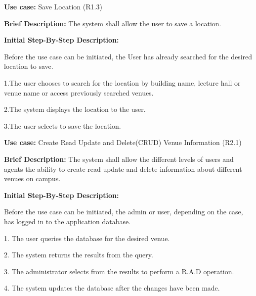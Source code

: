 \documentclass{article}
\begin{document}
    \begin{flushleft}
    \textbf{Use case:} Save Location (R1.3)
    \newline
    	
    \textbf{Brief Description:}
    \newline
    The system shall allow the user to save a location.
    \newline
    
    \textbf{Initial Step-By-Step Description:}
    
    Before the use case can be initiated, the User has already searched for the desired location to save.
	\newline    
	
1.The user chooses to search for the location by building name, lecture hall or venue name or access previously searched venues.

2.The system displays the location to the user.

3.The user selects to save the location.

\end{flushleft}

\begin{flushleft}
    \textbf{Use case:} Create Read Update and Delete(CRUD) Venue Information (R2.1)
    \newline
    	
    \textbf{Brief Description:}
    \newline
    The system shall allow the different levels of users and agents the ability to create read update and delete information about different venues on campus.
    \newline
    
    \textbf{Initial Step-By-Step Description:}
    
    Before the use case can be initiated, the admin or user, depending on the case, has logged in to the application database. 
	\newline    
	
1. The user queries the database for the desired venue.

2. The system returns the results from the query.

3. The administrator selects from the results to perform a R.A.D operation.

4. The system updates the database after the changes have been made.

\end{flushleft}
\end{document}

